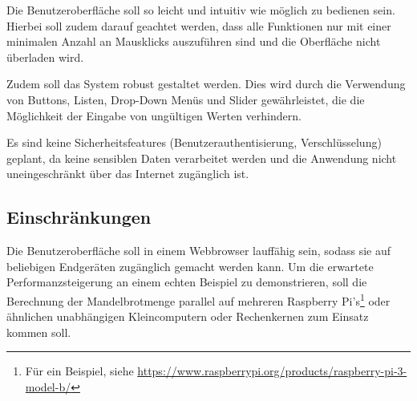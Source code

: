Die Benutzeroberfläche soll so leicht und intuitiv wie möglich zu bedienen sein.
Hierbei soll zudem darauf geachtet werden, dass alle Funktionen nur mit einer minimalen
Anzahl an Mausklicks auszuführen sind und die Oberfläche nicht überladen wird.

Zudem soll das System robust gestaltet werden.
Dies wird durch die Verwendung von Buttons, Listen, Drop-Down Menüs und Slider gewährleistet,
die die Möglichkeit der Eingabe von ungültigen Werten verhindern.

Es sind keine Sicherheitsfeatures (Benutzerauthentisierung, Verschlüsselung) geplant, da keine sensiblen Daten verarbeitet werden und die Anwendung nicht uneingeschränkt über das Internet zugänglich ist.

\subsection{Einschränkungen}

Die Benutzeroberfläche soll in einem Webbrowser lauffähig sein, sodass sie auf beliebigen Endgeräten
zugänglich gemacht werden kann.
Um die erwartete Performanzsteigerung an einem echten Beispiel zu demonstrieren,
soll die Berechnung der Mandelbrotmenge parallel auf mehreren Raspberry Pi’s\footnote{Für ein Beispiel, siehe \url{https://www.raspberrypi.org/products/raspberry-pi-3-model-b/}} oder ähnlichen unabhängigen Kleincomputern oder Rechenkernen zum Einsatz kommen soll.

